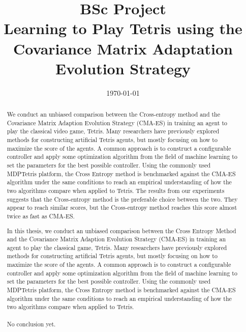 







\title{BSc Project\\\textbf{Learning to Play Tetris using
    the Covariance Matrix Adaptation
    Evolution Strategy}}
\date{\today}
\maketitle

\tableofcontents

\clearpage

\begin{abstract}
We conduct an unbiased comparison between 
the Cross-entropy method and the Covariance Matrix Adaption
Evolution Strategy (CMA-ES) in training 
an agent to play the classical video game, Tetris. Many researchers have 
previously explored methods for constructing artificial Tetris
agents, but mostly focusing on how to maximize the score of the agents.
A common approach is to construct a configurable controller
and apply some optimization algorithm from the field of machine learning
to set the parameters for the best possible controller. Using the 
commonly used MDPTetris \citep{mdptetris} platform, the Cross Entropy
method is benchmarked against the CMA-ES algorithm under the same
conditions to reach an empirical understanding of how the two algorithms
compare when applied to Tetris. The results from our experiments
suggests that the Cross-entropy method is the preferable choice
between the two. They appear to reach similar scores, 
but the Cross-entropy method reaches this score almost twice as
fast as CMA-ES.
\end{abstract}

\begin{abstract}
In this thesis, we conduct an unbiased comparison between 
the Cross Entropy Method and the Covariance Matrix Adaption
Evolution Strategy (CMA-ES) in training 
an agent to play the classical game, Tetris. Many researchers have 
previously explored methods for constructing artificial Tetris
agents, but mostly focusing on how to maximize the score of the agents.
A common approach is to construct a configurable controller
and apply some optimization algorithm from the field of machine learning
to set the parameters for the best possible controller. Using the 
commonly used MDPTetris \citep{mdptetris} platform, the Cross Entropy
method is benchmarked against the CMA-ES algorithm under the same
conditions to reach an empirical understanding of how the two algorithms
compare when applied to Tetris.\\
\\
No conclusion yet.
\end{abstract}



